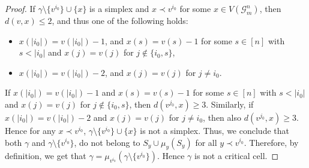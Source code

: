 \documentclass{amsart}
\theoremstyle{definition}
\theoremstyle{remark}
\numberwithin{equation}{section}
\newcommand{\samir}[1]{\textcolor{cyan!65!black}{#1}}
\begin{document}
\begin{proof}
If $\gamma \setminus \{v^{i_0}\} \cup \{x\}$ is a simplex and $x \prec v^{i_0}$ for some $x \in V(\mathcal{G}_m^n)$, then $d(v,x)\leq 2$, and thus one of the following holds:
	\begin{itemize}
		\item $x(|i_0|) = v(|i_0|) - 1$, and $x(s) = v(s) - 1$ for some $s \in [n]$ with $s < |i_0|$ and $x(j)=v(j)$ for $j\notin \{i_0,s\}$, 
		\item $x(|i_0|) = v(|i_0|) - 2$, and $x(j)=v(j)$ for $j\neq i_0$.
	\end{itemize}
	If $x(|i_0|) = v(|i_0|) - 1$ and $x(s) = v(s) - 1$ for some $s \in [n]$ with $s < |i_0|$ and $x(j)=v(j)$ for $j\notin \{i_0,s\}$, then $d(v^{j_0}, x) \geq 3$. Similarly, if $x(|i_0|) = v(|i_0|) - 2$ and $x(j)=v(j)$ for $j\neq i_0$, then also $d(v^{j_0}, x) \geq 3$. Hence for any $x\prec v^{i_0}$, $\gamma \setminus \{v^{i_0}\} \cup \{x\}$  is not a simplex. Thus, we conclude that both $\gamma $ and $\gamma\setminus \{v^{i_0}\}$, do not belong to     $S_y \cup \mu_y(S_y)$ for all $y \prec v^{i_0}$. Therefore, by definition, we get that  $\gamma = \mu_{v^{i_0}}(\gamma \setminus \{v^{i_0}\})$. Hence $\gamma$ is not a critical cell. 
	\smallskip
	
	
	
	
	
	
	

\end{proof}
\end{document}
